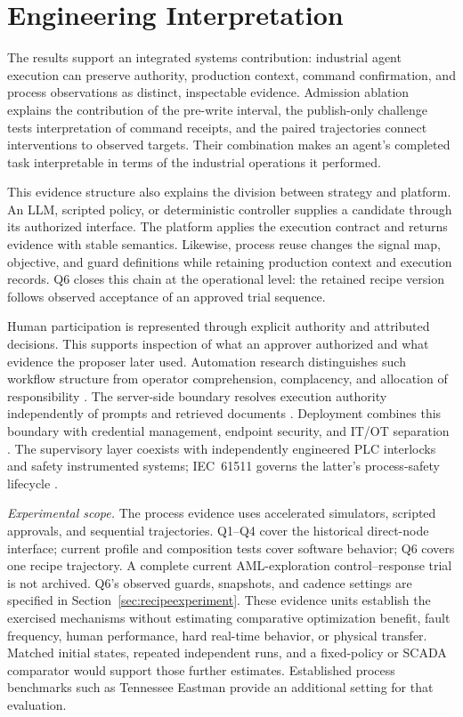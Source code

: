 \section{Engineering Interpretation}
\label{sec:limits}
The results support an integrated systems contribution: industrial agent
execution can preserve authority, production context, command confirmation,
and process observations as distinct, inspectable evidence. Admission
ablation explains the contribution of the pre-write interval, the
publish-only challenge tests interpretation of command receipts, and the
paired trajectories connect interventions to observed targets. Their
combination makes an agent's completed task interpretable in terms of the
industrial operations it performed.

This evidence structure also explains the division between strategy and
platform. An LLM, scripted policy, or deterministic controller supplies a
candidate through its authorized interface. The platform applies the
execution contract and returns evidence with stable semantics. Likewise,
process reuse changes the signal map, objective, and guard definitions
while retaining production context and execution records. Q6 closes this
chain at the operational level: the retained recipe version follows
observed acceptance of an approved trial sequence.

Human participation is represented through explicit authority and
attributed decisions. This supports inspection of what an approver
authorized and what evidence the proposer later used. Automation research
distinguishes such workflow structure from operator comprehension,
complacency, and allocation of responsibility
\cite{parasuramanmanzey2010complacency,parasuraman2000model,bainbridge1983ironies}.
The server-side boundary resolves execution authority independently of
prompts and retrieved documents \cite{greshake2023injection,liu2024pinjection}.
Deployment combines this boundary with credential management, endpoint
security, and IT/OT separation \cite{iec62443-3-3}. The supervisory layer
coexists with independently engineered PLC interlocks and safety
instrumented systems; IEC~61511 governs the latter's process-safety
lifecycle \cite{iec61511}.

\noindent\textit{Experimental scope.}
The process evidence uses accelerated simulators, scripted approvals, and
sequential trajectories. Q1--Q4 cover the historical direct-node interface;
current profile and composition tests cover software behavior; Q6 covers
one recipe trajectory. A complete current AML-exploration control--response
trial is not archived. Q6's observed guards, snapshots, and cadence settings
are specified in Section~\ref{sec:recipeexperiment}. These evidence units
establish the exercised
mechanisms without estimating comparative optimization benefit, fault
frequency, human performance, hard real-time behavior, or physical transfer.
Matched initial states, repeated independent runs, and a fixed-policy or
SCADA comparator would support those further estimates. Established process
benchmarks such as Tennessee Eastman \cite{downs1993tep} provide an
additional setting for that evaluation.

